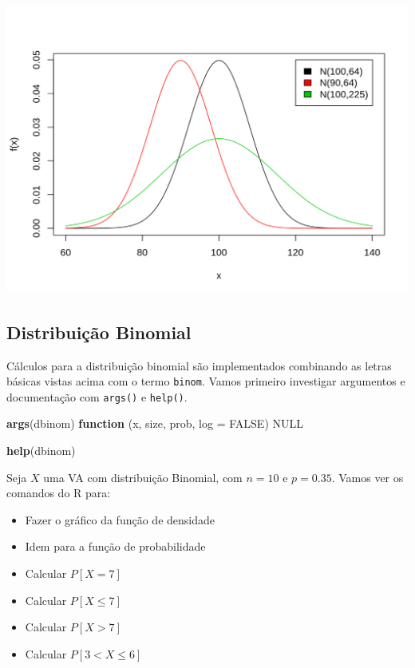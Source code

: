 \documentclass[10pt,a4paper]{book}
\newenvironment{Shaded}{\begin{snugshade}}{\end{snugshade}}
\newcommand{\KeywordTok}[1]{\textcolor[rgb]{0.13,0.29,0.53}{\textbf{#1}}}
\newcommand{\DataTypeTok}[1]{\textcolor[rgb]{0.13,0.29,0.53}{#1}}
\newcommand{\OtherTok}[1]{\textcolor[rgb]{0.56,0.35,0.01}{#1}}
\newcommand{\ControlFlowTok}[1]{\textcolor[rgb]{0.13,0.29,0.53}{\textbf{#1}}}
\newcommand{\NormalTok}[1]{#1}
\providecommand{\tightlist}{%
  \setlength{\itemsep}{0pt}\setlength{\parskip}{0pt}}
\begin{document}
\begin{center}\includegraphics{figures/unnamed-chunk-345-1} \end{center}

\subsection{Distribuição Binomial}\label{distribuiuxe7uxe3o-binomial}

Cálculos para a distribuição binomial são implementados combinando as
letras básicas vistas acima com o termo \texttt{binom}. Vamos primeiro
investigar argumentos e documentação com \texttt{args()} e
\texttt{help()}.

\begin{Shaded}
\begin{Highlighting}[]
\KeywordTok{args}\NormalTok{(dbinom)}
\ControlFlowTok{function}\NormalTok{ (x, size, prob, }\DataTypeTok{log =} \OtherTok{FALSE}\NormalTok{) }
\OtherTok{NULL}
\end{Highlighting}
\end{Shaded}

\begin{Shaded}
\begin{Highlighting}[]
\KeywordTok{help}\NormalTok{(dbinom)}
\end{Highlighting}
\end{Shaded}

Seja \(X\) uma VA com distribuição Binomial, com \(n=10\) e \(p=0.35\).
Vamos ver os comandos do R para:

\begin{itemize}
\tightlist
\item
  Fazer o gráfico da função de densidade
\item
  Idem para a função de probabilidade
\item
  Calcular \(P[X = 7]\)
\item
  Calcular \(P[X \leq 7]\)
\item
  Calcular \(P[X > 7]\)
\item
  Calcular \(P[3 < X \leq 6]\)
\end{itemize}
\end{document}
